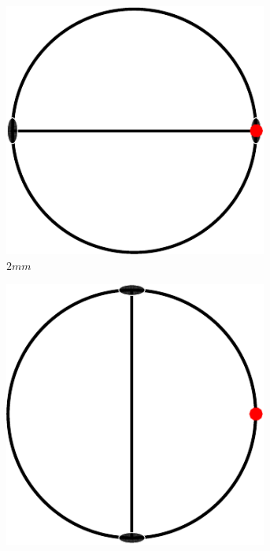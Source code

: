 \documentclass[compress]{beamer}
\begin{document}
\begin{frame}[fragile]
\begin{figure}[H]
    \begin{subfigure}{0.3\textwidth}
      \centering
      \includegraphics[width=0.95\textwidth]{pic/2mm}
      \caption{$2mm$}
    \end{subfigure}
    \begin{subfigure}{0.3\textwidth}
      \centering
      \includegraphics[width=0.95\textwidth]{pic/m2m}

\end{subfigure}
\end{figure}
\end{frame}
\end{document}

